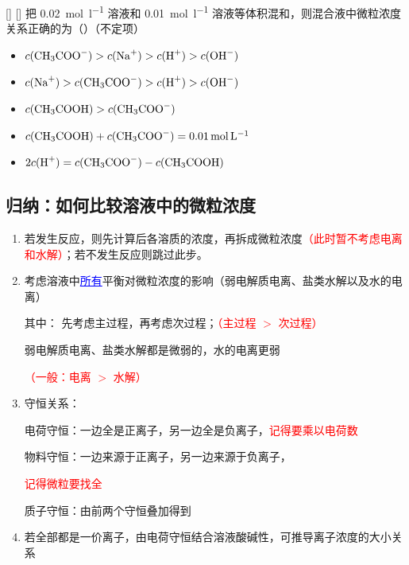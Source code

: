     \begin{xmp}
        [专题——溶液中的微粒浓度比较例 6]
        {}
        []
        []
        把 \SI{0.02}{\mole\per\litre}  溶液和 \SI{0.01}{\mole\per\litre}  溶液等体积混和，则混合液中微粒浓度关系正确的为（）（不定项）
        \begin{itemize}
            \item[A.] \(c(\cemh{CH3COO^-}) > c(\cemh{Na+}) > c(\cemh{H+}) > c(\cemh{OH^-})\)
            \item[B.] \(c(\cemh{Na+}) > c(\cemh{CH3COO^-}) > c(\cemh{H+}) > c(\cemh{OH^-})\)
            \item[C.] \(c(\cemh{CH3COOH}) > c(\cemh{CH3COO^-})\)
            \item[D.] \(c(\cemh{CH3COOH}) + c(\cemh{CH3COO^-}) = \SI{0.01}{\mole\per\litre}\)
            \item[E.] \(2c(\cemh{H+}) = c(\cemh{CH3COO^-}) - c(\cemh{CH3COOH})\)
        \end{itemize}
    \end{xmp}

    \subsection*{归纳：如何比较溶液中的微粒浓度}
    \label{subsec:归纳：如何比较溶液中的微粒浓度}

        \begin{enumerate}
            \item 若发生反应，则先计算后各溶质的浓度，再拆成微粒浓度\textcolor{red}{（此时暂不考虑电离和水解）}；若不发生反应则跳过此步。
            \item 考虑溶液中\textcolor{blue}{\uline{所有}}平衡对微粒浓度的影响（弱电解质电离、盐类水解以及水的电离）
            
            其中： 先考虑主过程，再考虑次过程；\textcolor{red}{（主过程 \(>\) 次过程）}
            
            \phantom{其中：} 弱电解质电离、盐类水解都是微弱的，水的电离更弱
            
             \textcolor{red}{（一般：电离 \(>\) 水解）}

            \item 守恒关系：
            
            电荷守恒：一边全是正离子，另一边全是负离子，\textcolor{red}{记得要乘以电荷数}
            
            物料守恒：一边来源于正离子，另一边来源于负离子，
            
            \phantom{物料守恒：}\textcolor{red}{记得微粒要找全}
            
            质子守恒：由前两个守恒叠加得到

            \item 若全部都是一价离子，由电荷守恒结合溶液酸碱性，可推导离子浓度的大小关系
        \end{enumerate}

